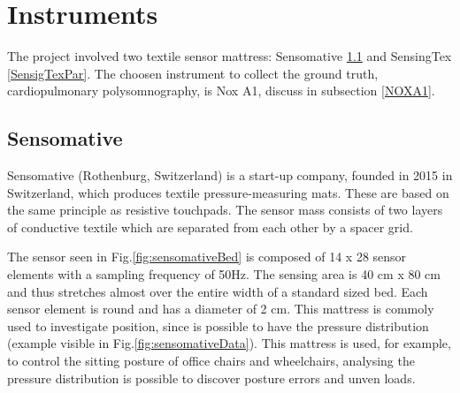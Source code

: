 \section{Instruments}
The project involved two textile sensor mattress: Sensomative \ref{SensomativePar} and SensingTex \ref{SensigTexPar}.
The choosen instrument to collect the ground truth, cardiopulmonary polysomnography, is Nox A1, discuss in subsection \ref{NOXA1}.

\subsection{Sensomative}\label{SensomativePar}
Sensomative (Rothenburg, Switzerland)\cite{sensomativeUrl} is a start-up company, founded in 2015 in Switzerland, which produces textile pressure-measuring mats. These are based on the same principle as resistive touchpads. The sensor mass
consists of two layers of conductive textile which are separated from each other by a spacer grid. 

The sensor seen in Fig.\ref{fig:sensomativeBed} is composed of 14 x 28 sensor elements with a sampling frequency of 50Hz. 
The sensing area is 40 cm x 80 cm and thus stretches almost over the entire width of a standard sized bed. Each sensor element is round and has a diameter of 2 cm.
This mattress is commoly used to investigate position, since is possible to have the pressure distribution (example visible in Fig.\ref{fig:sensomativeData}). This mattress is used, for example, to control the sitting posture of office chairs and wheelchairs, analysing the pressure distribution is possible to discover posture errors and unven loads.\\


